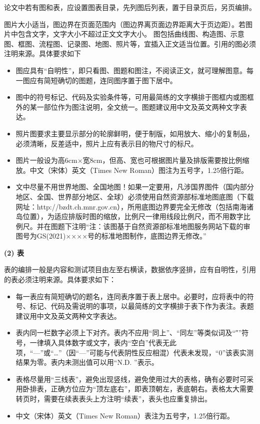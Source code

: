 论文中若有图和表，应设置图表目录，先列图后列表，置于目录页后，另页编排。

图片大小适当，图边界在页面范围内（图边界离页面边界距离大于页边距）。若图片中包含文字，文字大小不超过正文文字大小。
图包括曲线图、构造图、示意图、框图、流程图、记录图、地图、照片等，宜插入正文适当位置。引用的图必须注明来源。具体要求如下
\begin{itemize}
    \item 图应具有“自明性”，即只看图、图题和图注，不阅读正文，就可理解图意。每一图应有简短确切的图题，连同图序置于图下居中。
    \item 图中的符号标记、代码及实验条件等，可用最简练的文字横排于图框内或图框外的某一部位作为图注说明，全文统一。图题建议用中文及英文两种文字表达。
    \item 照片图要求主要显示部分的轮廓鲜明，便于制版，如用放大、缩小的复制品，必须清晰，反差适中，照片上应有表示目的物尺寸的标尺。
    \item 图片一般设为高6cm×宽8cm，但高、宽也可根据图片量及排版需要按比例缩放。中文（宋体）英文（Times New Roman）图注为五号字，1.25倍行距。
    \item 文中尽量不用世界地图、全国地图！如果一定要用，凡涉国界图件（国内部分地区、全国、世界部分地区、全球）必须使用自然资源部标准地图底图（下载网址：http://bzdt.ch.mnr.gov.cn），所用底图边界要完全无修改（包括南海诸岛位置），为适应排版时图的缩放，比例尺一律用线段比例尺，而不用数字比例尺。并在图题下注明“注：该图基于自然资源部标准地图服务网站下载的审图号为GS(2021)××××号的标准地图制作，底图边界无修改。”
\end{itemize}

\textbf{(2) 表}

表的编排一般是内容和测试项目由左至右横读，数据依序竖排，应有自明性，引用的表必须注明来源。具体要求如下：
\begin{itemize}
    \item 每一表应有简短确切的题名，连同表序置于表上居中。必要时，应将表中的符号、标记、代码及需说明的事项，以最简练的文字横排于表下作为表注。表题建议用中文及英文两种文字表达。
    \item 表内同一栏数字必须上下对齐。表内不应用“同上”、“同左”等类似词及“″”符号，一律填入具体数字或文字，表内“空白”代表无此项，“—”或“…”（因“—”可能与代表阴性反应相混）代表未发现，“0”该表实测结果为零。表内未测出值可以用“N.D. ”表示。
    \item 表格尽量用“三线表”，避免出现竖线，避免使用过大的表格，确有必要时可采用卧排表，正确方位应为“顶左底右”，即表顶朝左，表底朝右。表格太大需要转页时，需要在续表表头上方注明“续表”，表头也应重复排出。
    \item 中文（宋体）英文（Times New Roman）表注为五号字，1.25倍行距。
\end{itemize}

